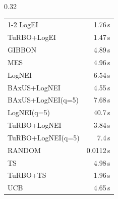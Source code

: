 \begin{table}[h]
\begin{subtable}[t]{0.32\textwidth}
\begin{tabular}{lr}
      \cmidrule{1-2}
      LogEI & 1.76\,s \\
      TuRBO+LogEI & 1.47\,s \\
      GIBBON & 4.89\,s \\
      MES & 4.96\,s \\
      LogNEI & 6.54\,s \\
      BAxUS+LogNEI & 4.55\,s \\
      BAxUS+LogNEI(q=5) & 7.68\,s \\
      LogNEI(q=5) & 40.7\,s \\
      TuRBO+LogNEI & 3.84\,s \\
      TuRBO+LogNEI(q=5) & 7.4\,s \\
      RANDOM & 0.0112\,s \\
      TS & 4.98\,s \\
      TuRBO+TS & 1.96\,s \\
      UCB & 4.65\,s \\
      \bottomrule
    \end{tabular}
  \end{subtable}
\end{table}
